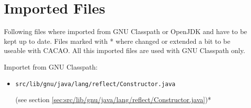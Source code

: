 \documentclass[a4paper, 10pt, titlepage]{scrartcl} %
\begin{document}
\section{Imported Files}
\label{sec:imported-files}

Following files where imported from GNU Classpath or OpenJDK and have to be
kept up to date. Files marked with * where changed or extended a bit to be
useable with CACAO. All this imported files are used with GNU Classpath only.

\begin{bfseries}Importet from GNU Classpath:\end{bfseries}
\begin{itemize}
 \item \begin{scriptsize}\verb|src|\hspace{0.0pt}\verb|/|\hspace{0.0pt}\verb|lib|\hspace{0.0pt}\verb|/|\hspace{0.0pt}\verb|gnu|\hspace{0.0pt}\verb|/|\hspace{0.0pt}\verb|java|\hspace{0.0pt}\verb|/|\hspace{0.0pt}\verb|lang|\hspace{0.0pt}\verb|/|\hspace{0.0pt}\verb|reflect|\hspace{0.0pt}\verb|/|\hspace{0.0pt}\verb|Constructor|\hspace{0.0pt}\verb|.|\hspace{0.0pt}\verb|java|\end{scriptsize} (see section \ref{sec:src/lib/gnu/java/lang/reflect/Constructor.java})*
\end{itemize}
\end{document}
